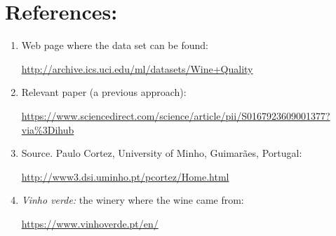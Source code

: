 \documentclass[10pt]{article}
\begin{document}
\section{References:}
\begin{enumerate}
  \item Web page where the data set can be found:
  
  \href{http://archive.ics.uci.edu/ml/datasets/Wine+Quality}{ http://archive.ics.uci.edu/ml/datasets/Wine+Quality}   
  
  \item Relevant paper (a previous approach): 
  
  \href{https://www.sciencedirect.com/science/article/pii/S0167923609001377?via\%3Dihub}{ https://www.sciencedirect.com/science/article/pii/S0167923609001377?via\%3Dihub}
  
  \item Source. Paulo Cortez, University of Minho, Guimarães, Portugal:

  \href{http://www3.dsi.uminho.pt/pcortez/Home.html}{ http://www3.dsi.uminho.pt/pcortez/Home.html}

  \item \textit{Vinho verde:} the winery where the wine came from:

  \href{https://www.vinhoverde.pt/en/}{ https://www.vinhoverde.pt/en/}

\end{enumerate}
\end{document}
